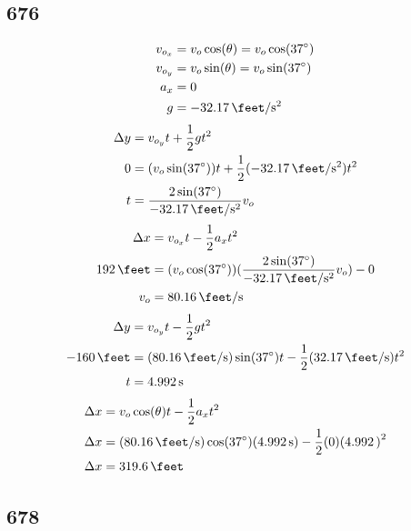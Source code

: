 \documentclass{article}
\begin{document}
\subsection{676}
\begin{align*}
	v_{o_x} & = v_o\cos(\theta) = v_o\cos(\SI{37}{\degree}) \\
	v_{o_y} & = v_o\sin(\theta) = v_o\sin(\SI{37}{\degree}) \\
	a_x & = 0 \\
	g & = -\SI{32.17}{\feet \per \second \squared}
\end{align*}
\begin{align*}
	\Delta y & = v_{o_y}t + \frac{1}{2}gt^2 \\
	0 & = (v_o\sin(\SI{37}{\degree}))t + \frac{1}{2}(-\SI{32.17}{\feet \per \second \squared})t^2 \\
	t & = \frac{2\sin(\SI{37}{\degree})}{-\SI{32.17}{\feet \per \second \squared}}v_o
\end{align*}
\begin{align*}
	\Delta x & = v_{o_x}t - \frac{1}{2}a_xt^2 \\
	\SI{192}{\feet} & = (v_o\cos(\SI{37}{\degree}))(\frac{2\sin(\SI{37}{\degree})}{-\SI{32.17}{\feet \per \second \squared}}v_o) - 0 \\
	v_o & = \SI{80.16}{\feet \per \second}
\end{align*}
\begin{align*}
	\Delta y & = v_{o_y}t - \frac{1}{2}gt^2 \\
	-\SI{160}{\feet} & = (\SI{80.16}{\feet \per \second})\sin(\SI{37}{\degree})t - \frac{1}{2}(\SI{32.17}{\feet \per \second})t^2 \\
	t & = \SI{4.992}{\second}
\end{align*}
\begin{align*}
	\Delta x & = v_o\cos(\theta)t - \frac{1}{2}a_xt^2 \\
	\Delta x & = (\SI{80.16}{\feet \per \second})\cos(\SI{37}{\degree})(\SI{4.992}{\second}) - \frac{1}{2}(0)(\SI{4.992})^2 \\
	\Delta x & = \SI{319.6}{\feet}
\end{align*}

\subsection{678}
\end{document}
